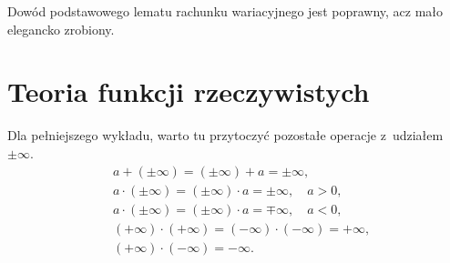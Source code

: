 \documentclass[a4paper,11pt]{article}
\begin{document}


\start {} Dowód podstawowego lematu rachunku wariacyjnego jest
poprawny, acz mało elegancko zrobiony.








\vspace{\spaceTwo}










\newpage
\section{Teoria funkcji rzeczywistych}

\vspace{\spaceTwo}







\start {} Dla pełniejszego wykładu, warto tu przytoczyć pozostałe
operacje z~udziałem $\pm \infty$.
\begin{equation}
  \label{eq:LojasiewiczWDTFRz-01}
  \begin{split}
    &a + ( \pm \infty ) = ( \pm \infty ) + a = \pm \infty, \\
    &a \cdot ( \pm \infty ) = ( \pm \infty ) \cdot a = \pm \infty,
    \quad a > 0, \\
    &a \cdot ( \pm \infty ) = ( \pm \infty ) \cdot a = \mp \infty,
    \quad a < 0, \\
    &( +\infty ) \cdot ( +\infty ) = ( -\infty ) \cdot ( -\infty )
    = +\infty, \\
    &( +\infty ) \cdot ( -\infty ) = -\infty.
  \end{split}
\end{equation}
\end{document}

